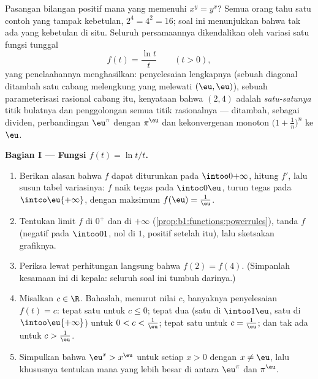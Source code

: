 \begin{problem}\label{pb:b1:functions:1}
Pasangan bilangan positif mana yang memenuhi $x^y = y^x$? Semua orang tahu
satu contoh yang tampak kebetulan, $2^4 = 4^2 = 16$; soal ini menunjukkan
bahwa tak ada yang kebetulan di situ. Seluruh persamaannya dikendalikan
oleh variasi satu fungsi tunggal
\[
f(t) = \frac{\ln t}{t} \qquad (t > 0),
\]
yang penelaahannya menghasilkan:  penyelesaian lengkapnya (sebuah diagonal ditambah satu
cabang melengkung yang melewati $(\eu, \eu)$), sebuah parameterisasi rasional
cabang itu, kenyataan bahwa $(2, 4)$ adalah \emph{satu-satunya} titik bulatnya
dan penggolongan semua titik rasionalnya --- ditambah, sebagai
dividen, perbandingan $\eu^\pi$ dengan $\pi^\eu$ dan
kekonvergenan monoton $\bigl(1 + \frac1n\bigr)^n$ ke $\eu$.

\medskip
\noindent\textbf{Bagian I --- Fungsi $f(t) = \ln t / t$.}
\begin{enumerate}
  \item Berikan alasan bahwa $f$ dapat diturunkan pada $\intoo0{+\infty}$,
        hitung $f'$, lalu susun tabel variasinya: $f$
        naik tegas pada $\intoc0\eu$, turun tegas pada
        $\intco\eu{+\infty}$, dengan maksimum $f(\eu) = \frac1\eu$.
  \item Tentukan limit $f$ di $0^+$ dan di $+\infty$
        (\cref{prop:b1:functions:powerrules}), tanda $f$
        (negatif pada $\intoo01$, nol di $1$, positif setelah itu),
        lalu sketsakan grafiknya.
  \item Periksa lewat perhitungan langsung bahwa $f(2) = f(4)$. (Simpanlah
        kesamaan ini di kepala: seluruh soal ini tumbuh darinya.)
  \item Misalkan $c \in \R$. Bahaslah, menurut nilai $c$, banyaknya
        penyelesaian $f(t) = c$: tepat satu untuk $c \leq
        0$; tepat dua (satu di $\intoo1\eu$, satu di
        $\intoo\eu{+\infty}$) untuk $0 < c < \frac1\eu$; tepat satu
        untuk $c = \frac1\eu$; dan tak ada untuk $c > \frac1\eu$.
  \item Simpulkan bahwa $\eu^x > x^\eu$ untuk setiap $x > 0$ dengan $x \neq
        \eu$, lalu khususnya tentukan mana yang lebih besar di antara $\eu^\pi$ dan
        $\pi^\eu$.
\end{enumerate}


\end{problem}
